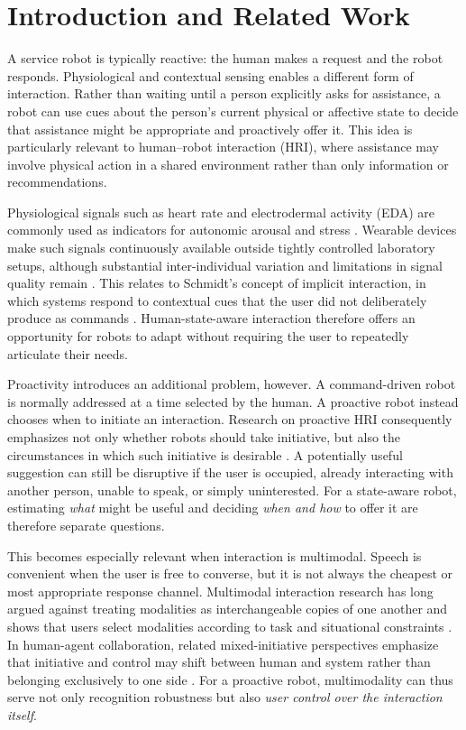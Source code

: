 
\section{Introduction and Related Work}

A service robot is typically reactive: the human makes a request and the robot
responds. Physiological and contextual sensing enables a different form of
interaction. Rather than waiting until a person explicitly asks for assistance,
a robot can use cues about the person's current physical or affective state to
decide that assistance might be appropriate and proactively offer it. This idea
is particularly relevant to human--robot interaction (HRI), where assistance may
involve physical action in a shared environment rather than only information or 
recommendations.

Physiological signals such as heart rate and electrodermal activity (EDA) are
commonly used as indicators for autonomic arousal and stress
\cite{healey2005stress, kim2018hrv}. Wearable devices make such signals
continuously available outside tightly controlled laboratory setups, although
substantial inter-individual variation and limitations in signal quality remain
\cite{schuurmans2020e4, vanlier2020protocol}. This relates to Schmidt's concept 
of implicit interaction, in which systems respond to contextual cues that the 
user did not deliberately produce as commands \cite{schmidt2000implicit}.
Human-state-aware interaction therefore offers an opportunity for robots to
adapt without requiring the user to repeatedly articulate their needs.

Proactivity introduces an additional problem, however. A command-driven robot is
normally addressed at a time selected by the human. A proactive robot instead
chooses when to initiate an interaction. Research on proactive HRI consequently
emphasizes not only whether robots should take initiative, but also the
circumstances in which such initiative is desirable
\cite{baraglia2016initiative, broek2024proactive}. A potentially useful
suggestion can still be disruptive if the user is occupied, already interacting
with another person, unable to speak, or simply uninterested. For a state-aware
robot, estimating \emph{what} might be useful and deciding \emph{when and how}
to offer it are therefore separate questions.

This becomes especially relevant when interaction is multimodal. Speech is
convenient when the user is free to converse, but it is not always the cheapest
or most appropriate response channel. Multimodal interaction research has long
argued against treating modalities as interchangeable copies of one another and
shows that users select modalities according to task and situational constraints
\cite{oviatt1999myths}. In human-agent collaboration, related mixed-initiative
perspectives emphasize that initiative and control may shift between human and
system rather than belonging exclusively to one side \cite{cila2022designing}.
For a proactive robot, multimodality can thus serve not only recognition
robustness but also \emph{user control over the interaction itself}.

